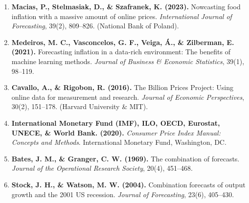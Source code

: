 \documentclass[11pt,a4paper]{article}
\begin{document}
\begin{enumerate}
    \item \textbf{Macias, P., Stelmasiak, D., \& Szafranek, K. (2023).} Nowcasting food inflation with a massive amount of online prices. \textit{International Journal of Forecasting}, 39(2), 809--826. (National Bank of Poland).
    \item \textbf{Medeiros, M. C., Vasconcelos, G. F., Veiga, Á., \& Zilberman, E. (2021).} Forecasting inflation in a data-rich environment: The benefits of machine learning methods. \textit{Journal of Business \& Economic Statistics}, 39(1), 98--119.
    \item \textbf{Cavallo, A., \& Rigobon, R. (2016).} The Billion Prices Project: Using online data for measurement and research. \textit{Journal of Economic Perspectives}, 30(2), 151--178. (Harvard University \& MIT).
    \item \textbf{International Monetary Fund (IMF), ILO, OECD, Eurostat, UNECE, \& World Bank. (2020).} \textit{Consumer Price Index Manual: Concepts and Methods}. International Monetary Fund, Washington, DC.
    \item \textbf{Bates, J. M., \& Granger, C. W. (1969).} The combination of forecasts. \textit{Journal of the Operational Research Society}, 20(4), 451--468.
    \item \textbf{Stock, J. H., \& Watson, M. W. (2004).} Combination forecasts of output growth and the 2001 US recession. \textit{Journal of Forecasting}, 23(6), 405--430.
\end{enumerate}
\end{document}
